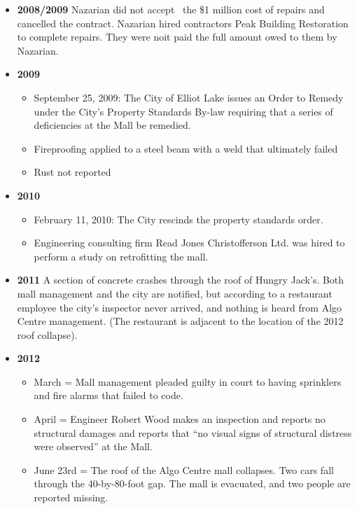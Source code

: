 \documentclass[12pt]{article}
\begin{document}
\begin{itemize}
    \item \textbf{\textbf{2008/2009}}
Nazarian did not accept  the \$1 million cost of repairs and cancelled the contract. Nazarian hired contractors Peak Building Restoration to complete repairs. They were noit paid the full amount owed to them by Nazarian. 

    \item \textbf{\textbf{2009}}
    \begin{itemize}
        \item September 25, 2009: The City of Elliot Lake issues an Order to Remedy under the City’s Property Standards By-law requiring that a series of deficiencies at the Mall be remedied.
        \item Fireproofing applied to a steel beam with a weld that ultimately failed
        \item Rust not reported
    \end{itemize}
    \item \textbf{\textbf{2010}}
    \begin{itemize}
        \item February 11, 2010: The City rescinds the property standards order.
        \item Engineering consulting firm Read Jones Christofferson Ltd. was hired to perform a study on retrofitting the mall. 
    \end{itemize}
    \item \textbf{\textbf{2011}}
A section of concrete crashes through the roof of Hungry Jack’s. Both mall management and the city are notified, but according to a restaurant employee the city’s inspector never arrived, and nothing is heard from Algo Centre management. (The restaurant is adjacent to the location of the 2012 roof collapse).

    \item \textbf{\textbf{2012}}
    \begin{itemize}
        \item March = Mall management pleaded guilty in court to having sprinklers and fire alarms that failed to code.
        \item April = Engineer Robert Wood makes an inspection and reports no structural damages and reports that “no visual signs of structural distress were observed” at the Mall.
        \item June 23rd = The roof of the Algo Centre mall collapses. Two cars fall through the 40-by-80-foot gap. The mall is evacuated, and two people are reported missing.
    \end{itemize}
\end{itemize}
\end{document}
